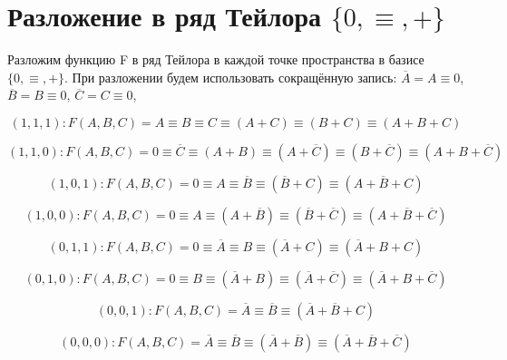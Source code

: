 \documentclass[a4paper,10pt]{article} %
\begin{document}
	
	\section{Разложение в ряд Тейлора $\{0, \equiv, +\}$}
	Разложим функцию F в ряд Тейлора в каждой точке пространства в базисе 
	$\{0, \equiv, +\}$. При разложении будем использовать сокращённую запись: 
	$\overline{A} = A \equiv 0$, $\overline{B} = B \equiv 0$,
	$\overline{C} = C \equiv 0$,
	
	\begin{equation}
	(1, 1, 1): F(A, B, C) = A \equiv B \equiv C \equiv (A + C) 
	\equiv (B + C) \equiv (A + B + C)
	\end{equation}
	
	\begin{equation}
	(1, 1, 0): F(A, B, C) = 0 \equiv \overline{C} \equiv (A + B) 
	\equiv (A + \overline{C}) \equiv (B + \overline{C}) 
	\equiv (A + B + \overline{C})
	\end{equation}
	
	\begin{equation}
	(1, 0, 1): F(A, B, C) = 0 \equiv A \equiv \overline{B} 
	\equiv (\overline{B} + C) \equiv (A + \overline{B} + C)
	\end{equation}
	
	\begin{equation}
	(1, 0, 0): F(A, B, C) = 0 \equiv A \equiv (A + \overline{B}) 
	\equiv (\overline{B} + \overline{C}) 
	\equiv (A + \overline{B} + \overline{C})
	\end{equation}
	
	\begin{equation}
	(0, 1, 1): F(A, B, C) = 0 \equiv \overline{A} \equiv B \equiv 
	(\overline{A} + C) \equiv (\overline{A} + B + C)
	\end{equation}
	
	\begin{equation}
	(0, 1, 0): F(A, B, C) = 0 \equiv B \equiv (\overline{A} + B) 
	\equiv (\overline{A} + \overline{C}) 
	\equiv (\overline{A} + B + \overline{C})
	\end{equation}
	
	\begin{equation}
	(0, 0, 1): F(A, B, C) = \overline{A} \equiv \overline{B} 
	\equiv (\overline{A} + \overline{B} + C)
	\end{equation}
	
	\begin{equation}
	(0, 0, 0): F(A, B, C) = \overline{A} \equiv \overline{B} 
	\equiv (\overline{A} + \overline{B}) 
	\equiv (\overline{A} + \overline{B} + \overline{C})
	\end{equation}
\end{document}
